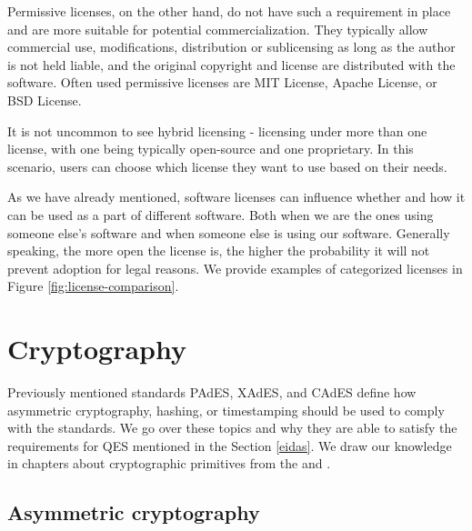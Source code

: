 \documentclass[thesismargins, english, thesislinespacing, onelinechapterstyle, upjsfrontpage]{rnthesis}
\begin{document}
Permissive licenses, on the other hand, do not have such a requirement in place and are more suitable for potential commercialization.
They typically allow commercial use, modifications, distribution or sublicensing as long as the author is not held liable, and the original copyright and license are distributed with the software.
Often used permissive licenses are MIT License, Apache License, or BSD License.

It is not uncommon to see hybrid licensing - licensing under more than one license, with one being typically open-source and one proprietary.
In this scenario, users can choose which license they want to use based on their needs.


As we have already mentioned, software licenses can influence whether and how it can be used as a part of different software.
Both when we are the ones using someone else's software and when someone else is using our software.
Generally speaking, the more open the license is, the higher the probability it will not prevent adoption for legal reasons.
We provide examples of categorized licenses in Figure \ref{fig:license-comparison}.

\iffalse %
Various possible combinations can be seen in Figure \ref{fig:license-compatibility}, where greyed out options mean such combination is not possible unless a separate licensing agreement is reached with the copyright owner.

\obrazok{./figures/license-compatibility}{Schematic representation of license directionality. \osoba{Morin 2012} \cite{licensing}}{license-compatibility}
\fi

\section{Cryptography} \label{cryptography}

Previously mentioned standards PAdES, XAdES, and CAdES define how asymmetric cryptography, hashing, or timestamping should be used to comply with the standards.
We go over these topics and why they are able to satisfy the requirements for QES mentioned in the Section \ref{eidas}.
We draw our knowledge in chapters about cryptographic primitives from the \cite{cryptotxtbook} and \cite{cryptojoy}.

\subsection{Asymmetric cryptography}
\end{document}
